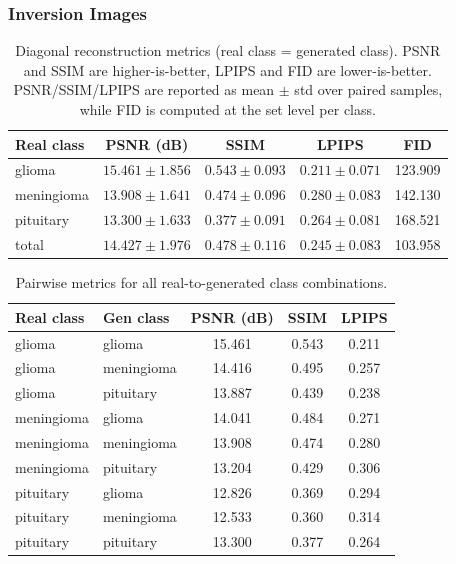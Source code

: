 \subsubsection{Inversion Images}

\begin{table}[H]
\centering
\caption{Diagonal reconstruction metrics (real class = generated class). PSNR and SSIM are higher-is-better, LPIPS and FID are lower-is-better. PSNR/SSIM/LPIPS are reported as mean $\pm$ std over paired samples, while FID is computed at the set level per class.}
\label{tab:diag_metrics_with_fid}
\begin{tabular}{lcccc}
\toprule
\textbf{Real class} & \textbf{PSNR (dB)} & \textbf{SSIM} & \textbf{LPIPS} & \textbf{FID} \\
\midrule
glioma      & $15.461 \pm 1.856$ & $0.543 \pm 0.093$ & $0.211 \pm 0.071$ & 123.909 \\
meningioma  & $13.908 \pm 1.641$ & $0.474 \pm 0.096$ & $0.280 \pm 0.083$ & 142.130 \\
pituitary   & $13.300 \pm 1.633$ & $0.377 \pm 0.091$ & $0.264 \pm 0.081$ & 168.521 \\
\midrule
total       & $14.427 \pm 1.976$ & $0.478 \pm 0.116$ & $0.245 \pm 0.083$ & 103.958 \\
\bottomrule
\end{tabular}
\end{table}


\begin{table}[ht]
\centering
\caption{Pairwise metrics for all real-to-generated class combinations.}
\label{tab:all_combos_psnr_ssim_lpips}
\begin{tabular}{llccc}
\toprule
\textbf{Real class} & \textbf{Gen class} & \textbf{PSNR (dB)} & \textbf{SSIM} & \textbf{LPIPS} \\
\midrule
glioma     & glioma     & 15.461 & 0.543 & 0.211 \\
glioma     & meningioma & 14.416 & 0.495 & 0.257 \\
glioma     & pituitary  & 13.887 & 0.439 & 0.238 \\
meningioma & glioma     & 14.041 & 0.484 & 0.271 \\
meningioma & meningioma & 13.908 & 0.474 & 0.280 \\
meningioma & pituitary  & 13.204 & 0.429 & 0.306 \\
pituitary  & glioma     & 12.826 & 0.369 & 0.294 \\
pituitary  & meningioma & 12.533 & 0.360 & 0.314 \\
pituitary  & pituitary  & 13.300 & 0.377 & 0.264 \\
\bottomrule
\end{tabular}
\end{table}

